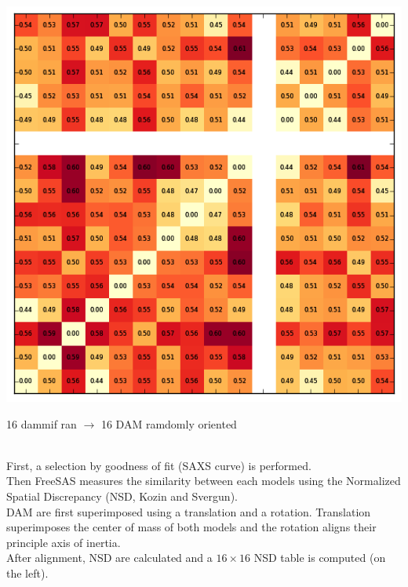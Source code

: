 \documentclass[12pt]{article}
\begin{document}

\vspace{0.4cm}
\begin{minipage}{0.3\linewidth}
    \begin{flushleft}
    \includegraphics[scale=0.4]{nsdtable.png}
    \end{flushleft}
\end{minipage} \hfill
\begin{minipage}{0.65\linewidth}
    \begin{large}
    16 dammif ran $\longrightarrow$ 16 DAM ramdomly oriented
    \end{large}\\
    First, a selection by goodness of fit (SAXS curve) is performed.\\
    Then FreeSAS measures the similarity between each models using the 
    Normalized Spatial Discrepancy (NSD, Kozin and Svergun).\\
    DAM are first superimposed using a translation and a rotation. 
    Translation superimposes the center of mass of both models and the 
    rotation aligns their principle axis of inertia.\\
    After alignment, NSD are calculated and a $16 \times 16$ NSD table 
    is computed (on the left).
\end{minipage}
\end{document}
